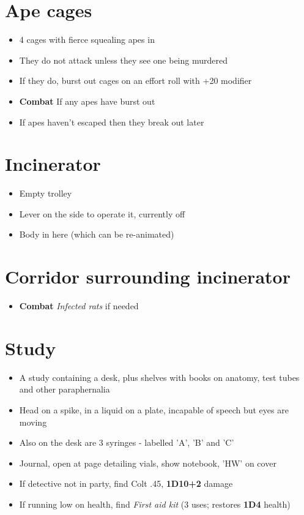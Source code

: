 \documentclass[12pt,a4paper]{article}
\begin{document}
\section*{Ape cages}
\begin{itemize}
\item{4 cages with fierce squealing apes in}
\item{They do not attack unless they see one being murdered}
\item{If they do, burst out cages on an effort roll with +20 modifier}
\item{\textbf{Combat} If any apes have burst out}
\item{If apes haven't escaped then they break out later}
\end{itemize}
\section*{Incinerator}
\begin{itemize}
\item{Empty trolley}
\item{Lever on the side to operate it, currently off}
\item{Body in here (which can be re-animated)}
\end{itemize}
\section*{Corridor surrounding incinerator}
\begin{itemize}
\item{\textbf{Combat} \textit{Infected rats} if needed}
\end{itemize}
\section*{Study}
\begin{itemize}
\item{A study containing a desk, plus shelves with books on anatomy, test tubes and other paraphernalia}
\item{Head on a spike, in a liquid on a plate, incapable of speech but eyes are moving}
\item{Also on the desk are 3 syringes - labelled 'A', 'B' and 'C'}
\item{Journal, open at page detailing vials, show notebook, 'HW' on cover}
\item{If detective not in party, find Colt .45, \textbf{1D10+2} damage}
\item{If running low on health, find \textit{First aid kit} (3 uses; restores \textbf{1D4} health)}
\end{itemize}
\end{document}
